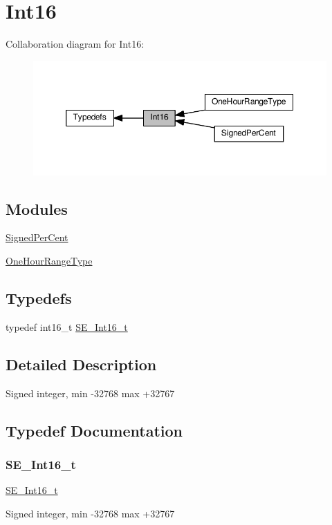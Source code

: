 \hypertarget{group__Int16}{}\section{Int16}
\label{group__Int16}
Collaboration diagram for Int16\+:\nopagebreak
\begin{figure}[H]
\begin{center}
\leavevmode
\includegraphics[width=350pt]{group__Int16}
\end{center}
\end{figure}
\subsection*{Modules}
\begin{DoxyCompactItemize}
\item 
\hyperlink{group__SignedPerCent}{Signed\+Per\+Cent}
\item 
\hyperlink{group__OneHourRangeType}{One\+Hour\+Range\+Type}
\end{DoxyCompactItemize}
\subsection*{Typedefs}
\begin{DoxyCompactItemize}
\item 
typedef int16\+\_\+t \hyperlink{group__Int16_ga0d600c7df811a7d4b4816e8965877690}{S\+E\+\_\+\+Int16\+\_\+t}
\end{DoxyCompactItemize}


\subsection{Detailed Description}
Signed integer, min -\/32768 max +32767 

\subsection{Typedef Documentation}
\mbox{\label{group__Int16_ga0d600c7df811a7d4b4816e8965877690}} 
\subsubsection{\texorpdfstring{S\+E\+\_\+\+Int16\+\_\+t}{SE\_Int16\_t}}
{\footnotesize\ttfamily \hyperlink{group__Int16_ga0d600c7df811a7d4b4816e8965877690}{S\+E\+\_\+\+Int16\+\_\+t}}

Signed integer, min -\/32768 max +32767 